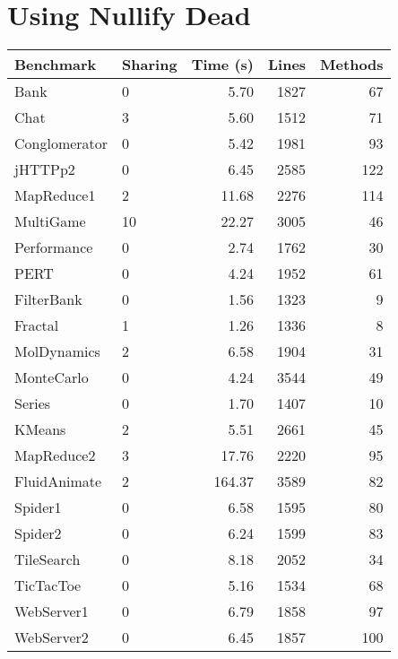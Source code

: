 \documentclass{article}
\begin{document}
\section{Using Nullify Dead}
\begin{tabular}{|l|l|r|r|r|}
\hline
Benchmark & Sharing & Time (s) & Lines & Methods \\
\hline
Bank & 0 & 5.70 & 1827 & 67 \\
Chat & 3 & 5.60 & 1512 & 71 \\
Conglomerator & 0 & 5.42 & 1981 & 93 \\
jHTTPp2 & 0 & 6.45 & 2585 & 122 \\
MapReduce1 & 2 & 11.68 & 2276 & 114 \\
MultiGame & 10 & 22.27 & 3005 & 46 \\
Performance & 0 & 2.74 & 1762 & 30 \\
PERT & 0 & 4.24 & 1952 & 61 \\
FilterBank & 0 & 1.56 & 1323 & 9 \\
Fractal & 1 & 1.26 & 1336 & 8 \\
MolDynamics & 2 & 6.58 & 1904 & 31 \\
MonteCarlo & 0 & 4.24 & 3544 & 49 \\
Series & 0 & 1.70 & 1407 & 10 \\
KMeans & 2 & 5.51 & 2661 & 45 \\
MapReduce2 & 3 & 17.76 & 2220 & 95 \\
FluidAnimate & 2 & 164.37 & 3589 & 82 \\
Spider1 & 0 & 6.58 & 1595 & 80 \\
Spider2 & 0 & 6.24 & 1599 & 83 \\
TileSearch & 0 & 8.18 & 2052 & 34 \\
TicTacToe & 0 & 5.16 & 1534 & 68 \\
WebServer1 & 0 & 6.79 & 1858 & 97 \\
WebServer2 & 0 & 6.45 & 1857 & 100 \\
\hline
\end{tabular}
\end{document}
